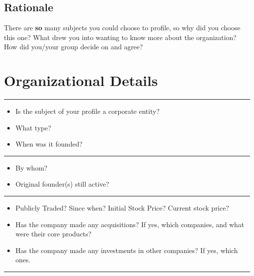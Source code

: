 \subsection{Rationale}\label{rationale}

There are \textbf{so} many subjects you could choose to profile, so why
did you choose this one? What drew you into wanting to know more about
the organization? How did you/your group decide on and agree?

\section{Organizational Details}\label{organizational-details}

\begin{center}\rule{3in}{0.4pt}\end{center}

\begin{itemize}
\itemsep1pt\parskip0pt
\item
  Is the subject of your profile a corporate entity?
\item
  What type?
\item
  When was it founded?
\end{itemize}

\begin{center}\rule{3in}{0.4pt}\end{center}

\begin{itemize}
\itemsep1pt\parskip0pt
\item
  By whom?
\item
  Original founder(s) still active?
\end{itemize}

\begin{center}\rule{3in}{0.4pt}\end{center}

\begin{itemize}
\itemsep1pt\parskip0pt
\item
  Publicly Traded? Since when? Initial Stock Price? Current stock price?
\item
  Has the company made any acquisitions? If yes, which companies, and
  what were their core products?
\item
  Has the company made any investments in other companies? If yes, which
  ones.
\end{itemize}

\begin{center}\rule{3in}{0.4pt}\end{center}

